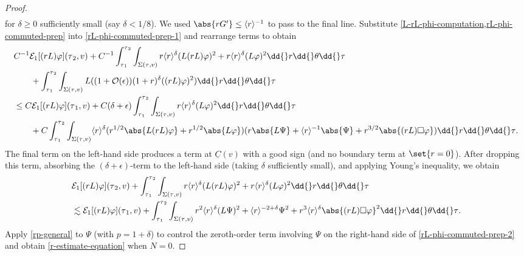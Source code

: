 \documentclass[10pt, reqno]{amsart}
\begin{document}
\begin{proof}
\begin{equation}
\begin{split}
\end{split}
\end{equation}
for \(\delta{} \ge 0\) sufficiently small (say \(\delta{} < 1/8\)). We used
\(\abs{rG'}\le \langle{}r\rangle^{-1}\) to pass to the final line. Substitute
\cref{L-rL-phi-computation,rL-phi-commuted-prep} into \cref{rL-phi-commuted-prep-1}
and rearrange terms to obtain
\begin{equation}
\begin{split}
&C^{-1}\mathcal{E}_1[(rL)\varphi{}](\tau{}_2,v) + C^{-1}\int_{\tau{}_1}^{\tau{}_2} \int _{\Sigma{}(\tau{},v)} r\langle{}r\rangle^\delta{}(L(rL)\varphi{})^2 + r\langle{}r\rangle^\delta{}(L\varphi{})^2\dd{}r\dd{}\theta{}\dd{}\tau{} \\
&\qquad + \int_{\tau{}_1}^{\tau{}_2} \int _{\Sigma{}(\tau{},v)} L((1+\mathcal{O}(\epsilon{}))(1+r)^\delta{}((rL)\varphi{})^2)\dd{}r\dd{}\theta{}\dd{}\tau{}\\
&\le  C\mathcal{E}_1[(rL)\varphi{}](\tau{}_1,v) +  C(\delta{}+\epsilon{})\int_{\tau{}_1}^{\tau{}_2} \int _{\Sigma{}(\tau{},v)} r\langle{}r\rangle^\delta{}(L\varphi{})^2\dd{}r\dd{}\theta{}\dd{}\tau{} \\
&\qquad + C\int_{\tau{}_1}^{\tau{}_2} \int _{\Sigma{}(\tau{},v)}\langle{}r\rangle^\delta{}(r^{1/2}\abs{L(rL)\varphi{}} + r^{1/2}\abs{L\varphi{}})(r\abs{L\Psi{}} + \langle{}r\rangle^{-1}\abs{\Psi{}} + r^{3/2}\abs{(rL)\Box{}\varphi{}})\dd{}r\dd{}\theta{}\dd{}\tau{}.
\end{split}
\end{equation}
The final term on the left-hand side produces a term at \(\underline{C}(v)\) with a
good sign (and no boundary term at \(\set{r=0}\)). After dropping this term,
absorbing the \((\delta{} + \epsilon{})\)-term to the left-hand side (taking
\(\delta{}\) sufficiently small), and applying Young's inequality, we obtain
\begin{equation}\label{rL-phi-commuted-prep-2}
\begin{split}
&\mathcal{E}_1[(rL)\varphi{}](\tau{}_2,v) + \int_{\tau{}_1}^{\tau{}_2} \int _{\Sigma{}(\tau{},v)} r\langle{}r\rangle^\delta{}(L(rL)\varphi{})^2 + r\langle{}r\rangle^\delta{}(L\varphi{})^2\dd{}r\dd{}\theta{}\dd{}\tau{} \\
&\lesssim \mathcal{E}_1[(rL)\varphi{}](\tau{}_1,v) + \int_{\tau{}_1}^{\tau{}_2} \int _{\Sigma{}(\tau{},v)}r^2\langle{}r\rangle^\delta{}(L\Psi{})^2 + \langle{}r\rangle^{-2+\delta{}}\Psi^2 + r^3\langle{}r\rangle^\delta{}\abs{(rL)\Box{}\varphi{}}^2\dd{}r\dd{}\theta{}\dd{}\tau{}.
\end{split}
\end{equation}
Apply \cref{rp-general} to \(\Psi{}\) (with \(p = 1+\delta{}\)) to control the zeroth-order
term involving \(\Psi{}\) on the right-hand side of \cref{rL-phi-commuted-prep-2} and
obtain \cref{r-estimate-equation} when \(N = 0\).


\end{proof}
\end{document}
